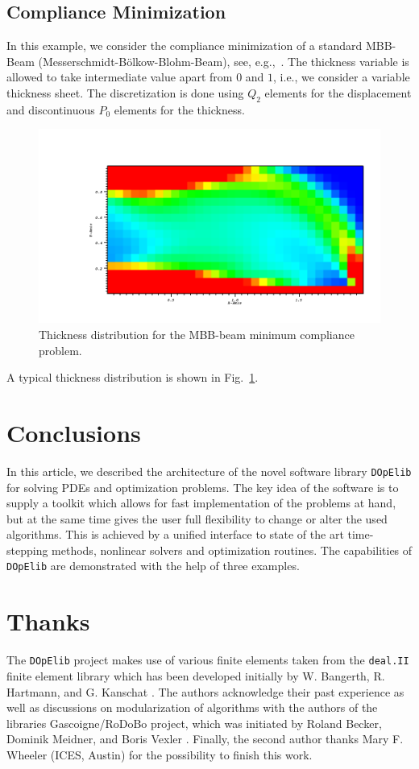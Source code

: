 \documentclass[smallextended]{svjour3}       %
\numberwithin{equation}{section}
\newcommand{\deal}{\texttt{deal.II}}
\newcommand{\dope}{\texttt{DOpElib}}
\begin{document}
\subsection{Compliance Minimization}
In this example, we consider the compliance minimization of a standard MBB-Beam (Messerschmidt-B\"olkow-Blohm-Beam), see, e.g.,~\cite{BendsoeSigmund:2003}.
The thickness variable is allowed to take intermediate value apart from $0$ and $1$,
i.e., we consider a variable thickness sheet. The discretization is done 
using $Q_2$ elements for the displacement and discontinuous $P_0$ elements for the 
thickness.
\begin{figure}
\centering
\includegraphics[width=1.\textwidth, viewport=205 88 975 500, clip]{Pictures/MBB.png}
\caption{Thickness distribution for the MBB-beam minimum compliance problem.} 
\label{res:mbb}
\end{figure}
A typical thickness distribution is shown in Fig.~\ref{res:mbb}.

\section{Conclusions}
In this article, we described the architecture 
of the novel software library \dope{} for solving 
PDEs and optimization problems.  The key idea of the software is to supply a
toolkit which allows for fast implementation of the problems at hand, but at
the same time gives the user full flexibility to change or alter the used
algorithms. 
This is achieved by a unified interface 
to state of the art time-stepping methods, nonlinear solvers and optimization
routines. The capabilities of \dope{} are demonstrated with the help of three examples.


\section*{Thanks}
The \dope{} project makes use of various finite elements taken from  
the \deal{} \cite{dealnew} finite element library which has been developed
 initially by W. Bangerth, R. Hartmann, and G. Kanschat \cite{dealold}.
The authors acknowledge their past experience as well as discussions 
on modularization of algorithms
with 
the authors of the libraries 
Gascoigne/RoDoBo project, which was initiated by 
Roland Becker, Dominik Meidner, and Boris Vexler \cite{rodobo}. 
Finally, the second author thanks Mary F. Wheeler (ICES, Austin) for the 
possibility to finish this work.

%


%
\end{document}
